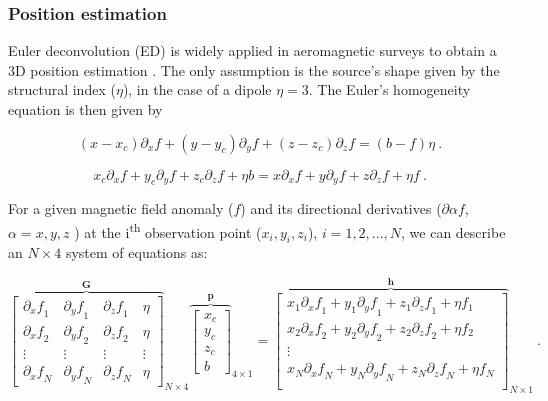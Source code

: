 \subsubsection{Position estimation}
    Euler deconvolution (ED) is widely applied in aeromagnetic surveys \citep{Barbosa2011, Melo2013, Melo2018} to obtain a 3D position estimation \cite[after][]{Reid1990}. The only assumption is the source's shape given by the structural index ($\eta$), in the case of a dipole $\eta = 3$. The Euler's homogeneity equation is then given by
    
        \begin{equation}
        \label{eq_euler_homogeneity}
        (x - x_c)\partial_x f
        + (y - y_c)\partial_y f
        + (z - z_c)\partial_z f
        = (b - f)\eta
        \ .
        \end{equation}
    
    
    \begin{equation}
    x_c \partial_x f + y_c \partial_y f + z_c \partial_z f + \eta b
    =
    x \partial_x f + y \partial_y f + z \partial_z f + \eta f
    \ .
    \end{equation}
    
    For a given magnetic field anomaly ($f$) and its directional derivatives ($\partial \alpha f$, $\alpha = x, y, z$ ) at the i\textsuperscript{th} observation point ($x_i, y_i, z_i$), $i=1, 2,..., N$, we can describe an $N \times 4$ system of equations as:
    
    \begin{equation}
    {\overbrace{
    \begin{bmatrix}
      {\partial_x f}_1 & {\partial_y f}_1 & {\partial_z f}_1 & \eta \\
      {\partial_x f}_2 & {\partial_y f}_2 & {\partial_z f}_2 & \eta \\
      \vdots & \vdots & \vdots & \vdots \\
      {\partial_x f}_N & {\partial_y f}_N & {\partial_z f}_N & \eta
    \end{bmatrix}
    }^{\mathbf{G}}}_{N \times 4}
    {\overbrace{
    \begin{bmatrix}
      x_c \\ y_c \\ z_c \\ b
    \end{bmatrix}
    }^{\mathbf{p}}}_{4 \times 1}
    =
    {\overbrace{
    \begin{bmatrix}
      x_1 {\partial_x f}_1 + y_1 {\partial_y f}_1 + z_1 {\partial_z f}_1 + \eta f_1 \\
      x_2 {\partial_x f}_2 + y_2 {\partial_y f}_2 + z_2 {\partial_z f}_2 + \eta f_2 \\
      \vdots \\
      x_N {\partial_x f}_N + y_N {\partial_y f}_N + z_N {\partial_z f}_N + \eta f_N \\
    \end{bmatrix}
    }^{\mathbf{h}}}_{N \times 1}
    \ .
    \end{equation}
    
